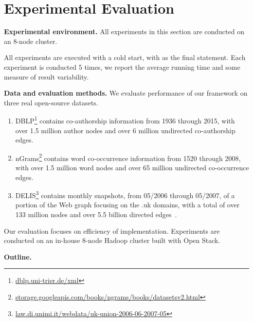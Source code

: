 \section{Experimental Evaluation}
\label{sec:exp}

{\bf Experimental environment.} All experiments in this section are
conducted on an 8-node cluster.  

All experiments are executed with a cold start, with
 as the final statement.  Each experiment is
conducted 5 times, we report the average running time and some measure
of result variability. 

{\bf Data and evaluation methods.}  We evaluate performance of our
framework on three real open-source datasets.  

\begin{enumerate}

\item DBLP\footnote{\url{dblp.uni-trier.de/xml}} contains co-authorship
  information from 1936 through 2015, with over 1.5 million author
  nodes and over 6 million undirected co-authorship edges.  

\item nGrams\footnote{\url{storage.googleapis.com/books/ngrams/books/datasetsv2.html}}
  contains word co-occurrence information from 1520 through 2008, with
  over 1.5 million word nodes and over 65 million undirected
  co-occurrence edges.

\item
  DELIS\footnote{\url{law.di.unimi.it/webdata/uk-union-2006-06-2007-05}}
  contains monthly snapshots, from 05/2006 through 05/2007, of a
  portion of the Web graph focusing on the .uk domains, with a total
  of over 133 million nodes and over 5.5 billion directed
  edges~\cite{BSVLTAG}.

\end{enumerate}

Our evaluation focuses on efficiency of implementation. Experiments
are conducted on an in-house 8-node Hadoop cluster built with Open
Stack. 

{\bf Outline.}


